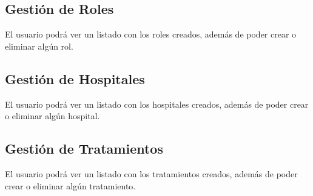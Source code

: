 \subsection{Gestión de Roles}
El usuario podrá ver un listado con los roles creados, además de poder crear o eliminar algún rol.

\subsection{Gestión de Hospitales}
El usuario podrá ver un listado con los hospitales creados, además de poder crear o eliminar algún hospital.

\subsection{Gestión de Tratamientos}
El usuario podrá ver un listado con los tratamientos creados, además de poder crear o eliminar algún tratamiento.
